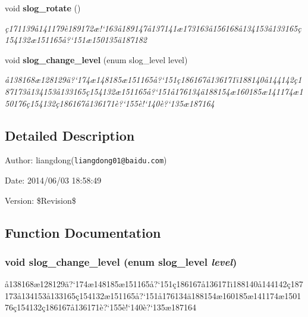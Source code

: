 \begin{CompactItemize}
void {\bf slog\_\-rotate} ()
\begin{CompactList}\small\item\em \c{c}171139\aa{}141179\`{e}189172\ae{}!`163\aa{}189147\aa{}137141\ae{}173163\aa{}156168\aa{}134153\aa{}133165\c{c}154132\ae{}151165\aa{}?`151\ae{}150135\"{a}187182 \item\end{CompactList}\item 
void {\bf slog\_\-change\_\-level} (enum slog\_\-level level)
\begin{CompactList}\small\item\em \aa{}138168\ae{}128129\"{a}?`174\ae{}148185\ae{}151165\aa{}?`151\c{c}186167\aa{}136171\"{\i}188140\aa{}144142\c{c}187173\aa{}134153\aa{}133165\c{c}154132\ae{}151165\aa{}?`151\aa{}176134\"{a}188154\ae{}160185\ae{}141174\ae{}150176\c{c}154132\c{c}186167\aa{}136171\`{e}?`155\`{e}!`140\`{e}?`135\ae{}187164 \item\end{CompactList}\end{CompactItemize}


\subsection{Detailed Description}
\begin{Desc}
\item[Author:]liangdong({\tt liangdong01@baidu.com}) \end{Desc}
\begin{Desc}
\item[Date:]2014/06/03 18:58:49 \end{Desc}
\begin{Desc}
\item[Version:]\$Revision\$ \end{Desc}


\subsection{Function Documentation}
\subsubsection{\setlength{\rightskip}{0pt plus 5cm}void slog\_\-change\_\-level (enum slog\_\-level {\em level})}\label{slog_8c_a13}


\aa{}138168\ae{}128129\"{a}?`174\ae{}148185\ae{}151165\aa{}?`151\c{c}186167\aa{}136171\"{\i}188140\aa{}144142\c{c}187173\aa{}134153\aa{}133165\c{c}154132\ae{}151165\aa{}?`151\aa{}176134\"{a}188154\ae{}160185\ae{}141174\ae{}150176\c{c}154132\c{c}186167\aa{}136171\`{e}?`155\`{e}!`140\`{e}?`135\ae{}187164 

